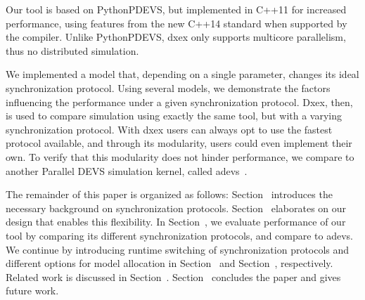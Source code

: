 Our tool is based on PythonPDEVS, but implemented in C++11 for increased performance, using features from the new C++14 standard when supported by the compiler.
Unlike PythonPDEVS, dxex only supports multicore parallelism, thus no distributed simulation.

We implemented a model that, depending on a single parameter, changes its ideal synchronization protocol.
Using several models, we demonstrate the factors influencing the performance under a given synchronization protocol.
Dxex, then, is used to compare simulation using exactly the same tool, but with a varying synchronization protocol.
With dxex users can always opt to use the fastest protocol available, and through its modularity, users could even implement their own.
To verify that this modularity does not hinder performance, we compare to another Parallel DEVS simulation kernel, called adevs~\cite{adevs}.

The remainder of this paper is organized as follows:
Section~\textsc{} introduces the necessary background on synchronization protocols.
Section~\textsc{} elaborates on our design that enables this flexibility.
In Section~\textsc{}, we evaluate performance of our tool by comparing its different synchronization protocols, and compare to adevs.
We continue by introducing runtime switching of synchronization protocols and different options for model allocation in Section~\textsc{} and Section~\textsc{}, respectively.
Related work is discussed in Section~\textsc{}.
Section~\textsc{} concludes the paper and gives future work.
